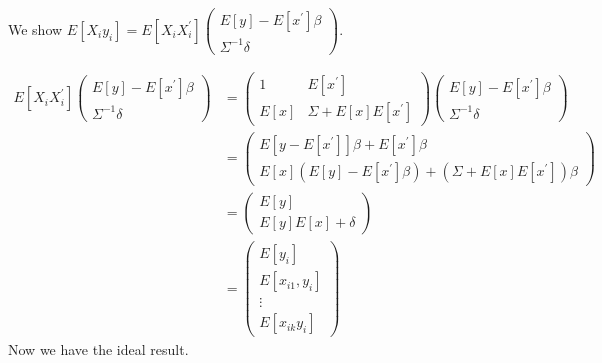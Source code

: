 \documentclass{article}
\begin{document}
We show $E\left[ X_i y_i \right] = E\left[ X_i X_i^{'} \right] \left(\begin{array}{cc} E[y] - E[x^{'}]\beta\\ \Sigma^{-1}\delta \end{array}\right)$.

\begin{align*}
	E\left[ X_i X_i^{'} \right] \left(\begin{array}{cc} E[y] - E[x^{'}]\beta\\ \Sigma^{-1}\delta \end{array}\right) &= \left(\begin{array}{cc} 1 & E[x^{'}] \\ E[x] & \Sigma + E[x]E[x^{'}] \end{array}\right)  \left(\begin{array}{cc} E[y] - E[x^{'}]\beta \\ \Sigma^{-1}\delta \end{array}\right)\\[8pt]
	&=  \left(\begin{array}{cc} E[y - E[x^{'}]]\beta + E[x^{'}]\beta \\[6pt] E[x](E[y] - E[x^{'}]\beta) + (\Sigma + E[x]E[x^{'}])\beta \end{array}\right)\\[8pt]
	&=  \left(\begin{array}{cc} E[y] \\ E[y]E[x] + \delta \end{array}\right)\\[8pt]
	&=  \left(\begin{array}{cc} E[y_i] \\ E[x_{i1}, y_i] \\ \vdots \\ E[x_{ik}y_i] \end{array}\right)
\end{align*}
Now we have the ideal result.
\end{document}
